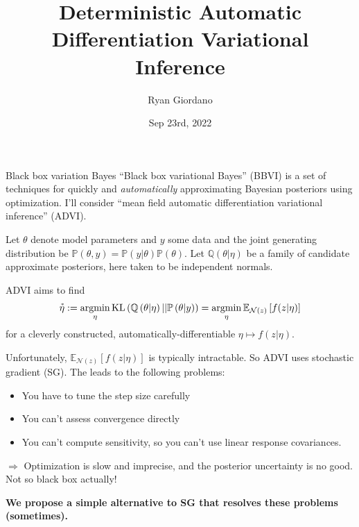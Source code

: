 \documentclass[8pt]{beamer}\usepackage[]{graphicx}\usepackage[]{color}
\title{Deterministic Automatic Differentiation Variational Inference}
\author{Ryan Giordano}
\date{Sep 23rd, 2022}
\institute{Massachusetts Institute of Technology}
\def\p#1{\mathbb{P}\left(#1\right)}
\def\q#1{\mathbb{Q}\left(#1\right)}
\def\y{y}
\def\z{z}
\def\normz{\mathcal{N}(z)}
\newcommand{\etastar}{\accentset{*}{\eta}}
\def\expect#1#2{\mathbb{E}_{#1}\left[#2\right]}
\def\kl#1{\mathrm{KL}\left(#1\right)}
\DeclareMathOperator*{\argmin}{\mathrm{argmin}}
\begin{document}

\begin{frame}{Black box variation Bayes}
%
``Black box variational Bayes'' (BBVI) is a set of techniques for quickly and
{\em automatically} approximating Bayesian posteriors using optimization. I'll
consider ``mean field automatic differentiation variational inference'' (ADVI).

\pause
Let $\theta$ denote model parameters and $\y$ some data and the joint
generating distribution be $\p{\theta, \y} = \p{\y \vert \theta} \p{\theta}$.
Let $\q{\theta \vert \eta}$ be a family of candidate approximate posteriors,
here taken to be independent normals.

ADVI aims to find
%
\begin{align*}
%
\etastar :=
    \argmin_{\eta} \kl{\q{\theta \vert \eta} || \p{\theta \vert \y}}
    = \argmin_{\eta} \expect{\normz}{f(\z  | \eta)}
%
\end{align*}
%
for a cleverly constructed, automatically-differentiable $\eta \mapsto f(\z |
\eta)$.

\pause
Unfortunately, $\expect{\normz}{f(\z  | \eta)}$ is typically intractable. So
ADVI uses stochastic gradient (SG).  The leads to the following problems:
%
\begin{itemize}
%
\item You have to tune the step size carefully
\item You can't assess convergence directly
\item You can't compute sensitivity, so you can't use linear response
covariances.
%
\end{itemize}
%
$\Rightarrow$ Optimization is slow and imprecise, and the posterior uncertainty
is no good.  Not so black box actually!

\textbf{
We propose a simple alternative to SG that resolves these
problems (sometimes).
}

%
\end{frame}



\end{document}
